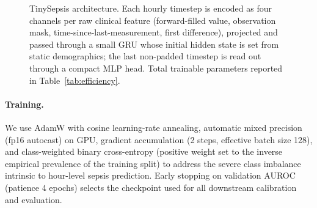 \documentclass[11pt]{article}
\begin{document}
\begin{figure}[t]
\centering
{}
\caption{TinySepsis architecture. Each hourly timestep is encoded as four channels per raw clinical feature (forward-filled value, observation mask, time-since-last-measurement, first difference), projected and passed through a small GRU whose initial hidden state is set from static demographics; the last non-padded timestep is read out through a compact MLP head. Total trainable parameters reported in Table~\ref{tab:efficiency}.}
\label{fig:architecture}
\end{figure}

\paragraph{Training.} We use AdamW with cosine learning-rate annealing, automatic mixed precision (fp16 autocast) on GPU, gradient accumulation (2 steps, effective batch size 128), and class-weighted binary cross-entropy (positive weight set to the inverse empirical prevalence of the training split) to address the severe class imbalance intrinsic to hour-level sepsis prediction. Early stopping on validation AUROC (patience 4 epochs) selects the checkpoint used for all downstream calibration and evaluation.
\end{document}
